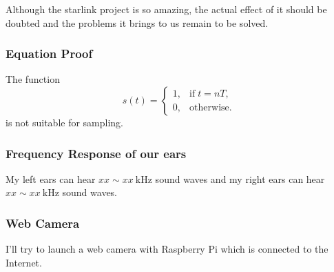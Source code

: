 \documentclass{article}
\begin{document}
Although the starlink project is so amazing, the actual effect of it should be doubted and the problems it brings to us remain to be solved.
\subsubsection*{Equation Proof}

The function 
$$
s(t) = 
\left\{
    \begin{array}{lr}
        1, & \mathrm{if}\; t = nT,\\
        0, & \mathrm{otherwise.}
    \end{array}
\right.
$$
is not suitable for sampling.
\subsubsection*{Frequency Response of our ears}

My left ears can hear $xx \sim xx ~ \mathrm{kHz}$ sound waves and my right ears can hear $xx \sim xx ~ \mathrm{kHz}$ sound waves.
\subsubsection*{Web Camera}

I'll try to launch a web camera with Raspberry Pi which is connected to the Internet.


\end{document}
